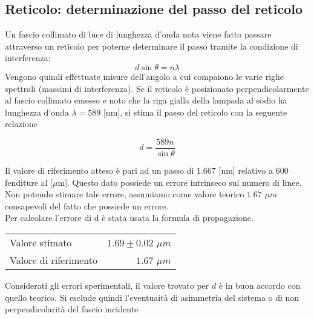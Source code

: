 \clearpage

\subsection{Reticolo: determinazione del passo del reticolo}
Un fascio collimato di luce di lunghezza d'onda nota viene fatto passare attraverso un reticolo per poterne determinare il passo tramite la condizione di interferenza:
    $$ d\sin\theta = n\lambda $$
Vengono quindi effettuate misure dell'angolo a cui compaiono le varie righe spettrali (massimi di interferenza).
%
Se il reticolo è posizionato perpendicolarmente al fascio collimato emesso e noto che la riga gialla della lampada al sodio ha lunghezza d'onda $ \lambda = 589 $ [nm], si stima il passo del reticolo con la seguente relazione

\begin{equation}
d = \frac{ 589 n }{ \sin\theta }
\end{equation}
%
%
%
%
%
%

%
%
Il valore di riferimento atteso è pari ad un passo di $1.667$ [nm] relativo a $600$ fenditure al [$\mu$m]. Questo dato possiede un errore intrinseco sul numero di linee. Non potendo stimare tale errore, assumiamo come valore teorico $1.67$ $\mu m$ consapevoli del fatto che possiede un errore.\\
Per calcolare l'errore di d è stata usata la formula di propagazione.
%
%
\begin{table}[H]
    \begin{center}
    \begin{tabular}{|l r|}
    \hline
        Valore stimato & $1.69 \pm 0.02$ $\mu m$ \\
        Valore di riferimento & $1.67$ $\mu m$ \\ 
    \hline
    \end{tabular}
    \end{center}
\end{table}
%
Considerati gli errori sperimentali, il valore trovato per $d$ è in buon accordo con quello teorico. Si esclude quindi l'eventuaità di asimmetria del sistema o di non perpendicolarità del fascio incidente